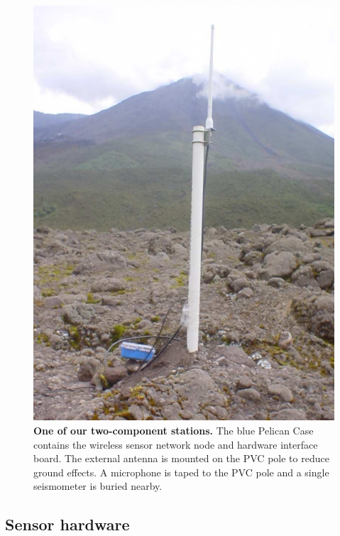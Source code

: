 \begin{figure}[t]
\begin{center}
\includegraphics[width=0.7\hsize]{./5-evaluation/figs/Node-212-5}
\end{center}
\caption{\textbf{One of our two-component stations.} The blue Pelican
Case contains the wireless sensor network node and hardware interface board.
The external antenna is mounted on the PVC pole to reduce ground effects.
A microphone is taped to the PVC pole and a single seismometer is buried
nearby.}
\label{includegraphics-fig-station2}
\end{figure}


\subsection{Sensor hardware}
\label{evaluation-sec-hardware}

